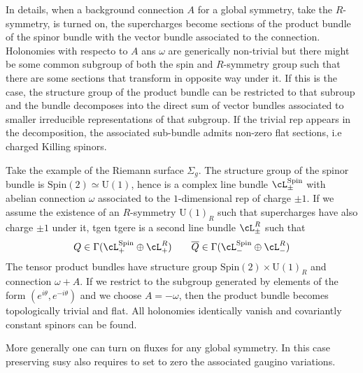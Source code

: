 \documentclass[11pt]{book}
\theoremstyle{definition}
\numberwithin{equation}{section}
\renewcommand*\rm[1]{\mathrm{#1}}
\newcommand*\U{\mathrm{U}}
\begin{document}
In details, when a background connection $A$ for a global symmetry, take the $R$-symmetry, is turned on, the supercharges become sections of the product bundle of the spinor bundle with the vector bundle associated to the connection. Holonomies with respecto to $A$ ans $\omega$ are generically non-trivial but there might be some common subgroup of both the spin and $R$-symmetry group such that there are some sections that transform in opposite way under it. If this is the case, the structure group of the product bundle can be restricted to that subroup and the bundle decomposes into the direct sum of vector bundles associated to smaller irreducible representations of that subgroup. If the trivial rep appears in the decomposition, the associated sub-bundle admits non-zero flat sections, i.e charged Killing spinors. 

Take the example of the Riemann surface $\Sigma_g$. The structure group of the spinor bundle is $\rm{Spin}(2)\simeq \U(1)$, hence is a complex line bundle $\cL_\pm^\rm{Spin}$ with abelian connection $\omega$ associated to the $1$-dimensional rep of charge $\pm 1$. If we assume the existence of an $R$-symmetry $\U(1)_R$ such that supercharges have also charge $\pm 1$ under it, tgen tgere is a second line bundle $\cL^R_\pm$ such that 
\begin{equation}
  Q\in \Gamma(\cL_+^\rm{Spin}\oplus \cL_+^R)\qquad \overline{Q}\in \Gamma(\cL_-^\rm{Spin}\oplus \cL_-^R)
\end{equation}
The tensor product bundles have structure group $\rm{Spin}(2)\times \U(1)_R$ and connection $\omega+A$. If we restrict to the subgroup generated by elements of the form $(e^{i\theta},e^{-i\theta})$ and we choose $A=-\omega$, then the product bundle becomes topologically trivial and flat. All holonomies identically vanish and covariantly constant spinors can be found. 

More generally one can turn on fluxes for any global symmetry. In this case preserving susy also requires to set to zero the associated gaugino variations. 

\backmatter
{}
{}

\end{document}
